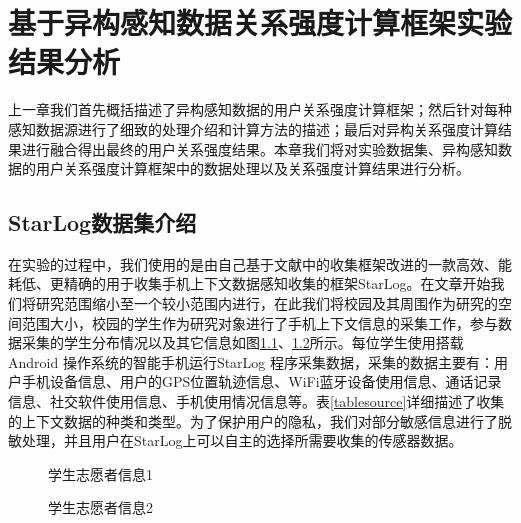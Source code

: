 \chapter{基于异构感知数据关系强度计算框架实验结果分析}
\label{chap:chapter03}
上一章我们首先概括描述了异构感知数据的用户关系强度计算框架；然后针对每种感知数据源进行了细致的处理介绍和计算方法的描述；最后对异构关系强度计算结果进行融合得出最终的用户关系强度结果。本章我们将对实验数据集、异构感知数据的用户关系强度计算框架中的数据处理以及关系强度计算结果进行分析。

\section{StarLog数据集介绍}
\label{sec:section5-1}
在实验的过程中，我们使用的是由自己基于文献\cite{rawassizadeh2013ubiqlog}中的收集框架改进的一款高效、能耗低、更精确的用于收集手机上下文数据感知收集的框架StarLog。在文章开始我们将研究范围缩小至一个较小范围内进行，在此我们将校园及其周围作为研究的空间范围大小，校园的学生作为研究对象进行了手机上下文信息的采集工作，参与数据采集的学生分布情况以及其它信息如图\ref{fig:stu_info1}、\ref{fig:stu_info2}所示。每位学生使用搭载Android 操作系统的智能手机运行StarLog 程序采集数据，采集的数据主要有：用户手机设备信息、用户的GPS位置轨迹信息、WiFi蓝牙设备使用信息、通话记录信息、社交软件使用信息、手机使用情况信息等。表\ref{tablesource}详细描述了收集的上下文数据的种类和类型。为了保护用户的隐私，我们对部分敏感信息进行了脱敏处理，并且用户在StarLog上可以自主的选择所需要收集的传感器数据。
\begin{figure}[htb]
  \centering%
  \hspace{4em}%
  \caption{学生志愿者信息1}
  \label{fig:stu_info1}
\end{figure}

\begin{figure}[htb]
  \centering%
  \hspace{4em}%
  \caption{学生志愿者信息2}
  \label{fig:stu_info2}
\end{figure}


